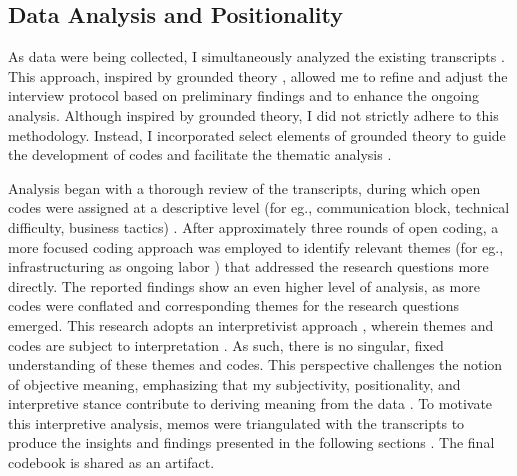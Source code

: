 \subsection{Data Analysis and Positionality}

As data were being collected, I simultaneously analyzed the existing transcripts \cite{smith2024qualitative}. This approach, inspired by grounded theory \cite{charmaz2015grounded}, allowed me to refine and adjust the interview protocol based on preliminary findings and to enhance the ongoing analysis. Although inspired by grounded theory, I did not strictly adhere to this methodology. Instead, I incorporated select elements of grounded theory to guide the development of codes and facilitate the thematic analysis \cite{braun2012thematic}.

Analysis began with a thorough review of the transcripts, during which open codes \cite{strauss2004open} were assigned at a descriptive level (for eg., communication block, technical difficulty, business tactics) \cite{terry2017thematic}. After approximately three rounds of open coding, a more focused coding \cite{thornberg2014grounded} approach was employed to identify relevant themes (for eg., infrastructuring as ongoing labor ) that addressed the research questions more directly. The reported findings show an even higher level of analysis, as more codes were conflated and corresponding themes for the research questions emerged. This research adopts an interpretivist approach \cite{10.1145/3633200}, wherein themes and codes are subject to interpretation \cite{10.1145/3359174}. As such, there is no singular, fixed understanding of these themes and codes. This perspective challenges the notion of objective meaning, emphasizing that my subjectivity, positionality, and interpretive stance contribute to deriving meaning from the data \cite{10.1145/3359174}. To motivate this interpretive analysis, memos were triangulated with the transcripts to produce the insights and findings presented in the following sections \cite{10.1145/3359174}. The final codebook is shared as an artifact. 




